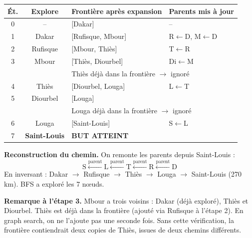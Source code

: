 \documentclass[11pt,a4paper]{article}
\begin{document}
{\small
\begin{center}
\begin{tabular}{|c|c|l|l|}
\hline
\textbf{Ét.} & \textbf{Explore} & \textbf{Frontière après expansion} & \textbf{Parents mis à jour} \\
\hline
0 & -- & [Dakar] & -- \\
1 & Dakar & [Rufisque, Mbour] & R$\leftarrow$D, M$\leftarrow$D \\
2 & Rufisque & [Mbour, Thiès] & T$\leftarrow$R \\
3 & Mbour & [Thiès, Diourbel] & Di$\leftarrow$M \\
  & & \multicolumn{2}{l|}{\scriptsize Thiès déjà dans la frontière $\rightarrow$ ignoré} \\
4 & Thiès & [Diourbel, Louga] & L$\leftarrow$T \\
5 & Diourbel & [Louga] & \\
  & & \multicolumn{2}{l|}{\scriptsize Louga déjà dans la frontière $\rightarrow$ ignoré} \\
6 & Louga & [Saint-Louis] & S$\leftarrow$L \\
7 & \textbf{Saint-Louis} & \textbf{BUT ATTEINT} & \\
\hline
\end{tabular}
\end{center}
}

\textbf{Reconstruction du chemin.} On remonte les parents depuis Saint-Louis :
$$\text{S} \xleftarrow{\text{parent}} \text{L} \xleftarrow{\text{parent}} \text{T} \xleftarrow{\text{parent}} \text{R} \xleftarrow{\text{parent}} \text{D}$$
En inversant : Dakar $\rightarrow$ Rufisque $\rightarrow$ Thiès $\rightarrow$ Louga $\rightarrow$ Saint-Louis (270 km). BFS a exploré les 7 nœuds.

\textbf{Remarque à l'étape 3.} Mbour a trois voisins : Dakar (déjà exploré), Thiès et Diourbel. Thiès est déjà dans la frontière (ajouté via Rufisque à l'étape 2). En graph search, on ne l'ajoute pas une seconde fois. Sans cette vérification, la frontière contiendrait deux copies de Thiès, issues de deux chemins différents.
\end{document}
